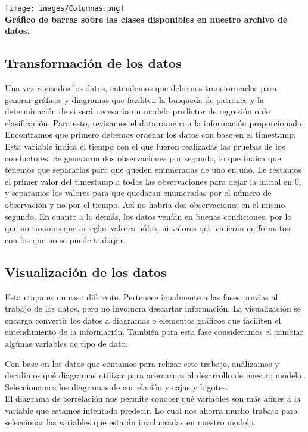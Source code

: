 \documentclass{article}
\begin{document}
        \texttt{[image: images/Columnas.png]} \\

        \textbf{Gráfico de barras sobre las clases disponibles en nuestro archivo de datos.} \\

    \subsection{Transformación de los datos}

        Una vez revisados los datos, entendemos que debemos transformarlos para generar gráficos y diagramas que faciliten la busqueda de patrones y la determinación de si será necesario un modelo predictor de regresión o de clasificación.
        Para esto, revisamos el dataframe con la información proporcionada. Encontramos que primero debemos ordenar los datos con base en el timestamp. Esta variable indica el tiempo con el que fueron realizadas las pruebas de los conductores. Se generaron dos observaciones por segundo, lo que indica que tenemos que separarlas para que queden enumeradas de uno en uno. Le restamos el primer valor del timestamp a todas las observaciones para dejar la inicial en 0, y separamos los valores para que quedaran enumeradas por el número de observación y no por el tiempo. Así no habría dos observaciones en el mismo segundo.
        En cuanto a lo demás, los datos venían en buenas condiciones, por lo que no tuvimos que arreglar valores núlos, ni valores que vinieran en formatos con los que no se puede trabajar.

    \subsection{Visualización de los datos}

       Esta etapa es un caso diferente. Pertenece igualmente a las fases previas al trabajo de los datos, pero no involucra descartar información. La visualización se encarga convertir los datos a diagramas o elementos gráficos que faciliten el entendimiento de la información. También para esta fase consideramos el cambiar algúnas variables de tipo de dato.

        Con base en los datos que contamos para relizar este trabajo, análizamos y decidimos qué diagramas utilizar para acercarnos al desarrollo de nuestro modelo. Seleccionamos los diagramas de correlación y cajas y bigotes. \\
        El diagrama de correlación nos permite conocer qué variables son más afínes a la variable que estamos intentado predecir. Lo cual nos ahorra mucho trabajo para seleccionar las variables que estarán involucradas en nuestro modelo. \\
\end{document}
